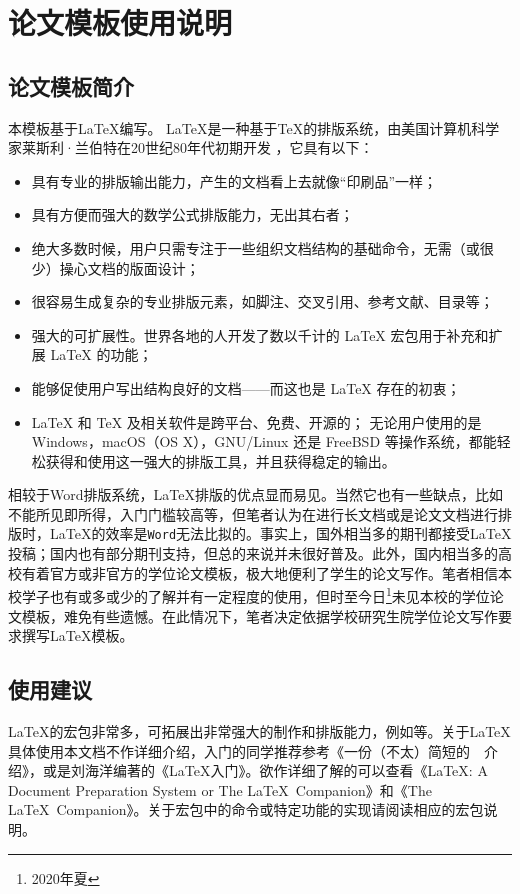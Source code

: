 \chapter{论文模板使用说明}
\graphicspath{{figures/chap02/}}
\section{论文模板简介}
本模板基于\LaTeX{}编写。 \LaTeX{}是一种基于\TeX{}的排版系统，由美国计算机科学家莱斯利·兰伯特在20世纪80年代初期开发 \cite{维基百科2020}，它具有以下\cite{CTEX开发小组2020}：

\begin{itemize}
    \item 具有专业的排版输出能力，产生的文档看上去就像“印刷品”一样；
    \item 具有方便而强大的数学公式排版能力，无出其右者；
    \item 绝大多数时候，用户只需专注于一些组织文档结构的基础命令，无需（或很少）操心文档的版面设计；
    \item 很容易生成复杂的专业排版元素，如脚注、交叉引用、参考文献、目录等；
    \item 强大的可扩展性。世界各地的人开发了数以千计的 \LaTeX{} 宏包用于补充和扩展 \LaTeX{} 的功能；
    \item 能够促使用户写出结构良好的文档——而这也是 \LaTeX{} 存在的初衷；
    \item \LaTeX{} 和 \TeX{} 及相关软件是跨平台、免费、开源的；
    无论用户使用的是 Windows，macOS（OS X），GNU/Linux 还是 FreeBSD 等操作系统，都能轻松获得和使用这一强大的排版工具，并且获得稳定的输出。
  \end{itemize}

相较于Word排版系统，\LaTeX{}排版的优点显而易见。当然它也有一些缺点，比如不能所见即所得，入门门槛较高等，但笔者认为在进行长文档或是论文文档进行排版时，\LaTeX{}的效率是\texttt{Word}无法比拟的。事实上，国外相当多的期刊都接受\LaTeX{}投稿；国内也有部分期刊支持，但总的来说并未很好普及。此外，国内相当多的高校有着官方或非官方的学位论文模板，极大地便利了学生的论文写作。笔者相信本校学子也有或多或少的了解并有一定程度的使用，但时至今日\footnote{2020年夏}未见本校的学位论文模板，难免有些遗憾。在此情况下，笔者决定依据学校研究生院学位论文写作要求撰写\LaTeX{}模板。

\section{使用建议}
\LaTeX{}的宏包非常多，可拓展出非常强大的制作和排版能力，例如等。关于\LaTeX{}具体使用本文档不作详细介绍，入门的同学推荐参考《一份（不太）简短的~\LaTeXe{}~介绍》\cite{CTEX开发小组2020}，或是刘海洋编著的《\LaTeX{}入门》\cite{刘海洋2013}。欲作详细了解的可以查看《\LaTeX{}: A Document Preparation System or The \LaTeX{}~Companion》\cite{Lamport1994}和《The \LaTeX{}~Companion》\cite{Mittelbach2004}。关于宏包中的命令或特定功能的实现请阅读相应的宏包说明。

